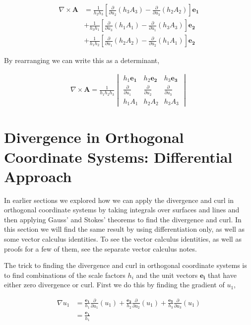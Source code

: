 \documentclass[11pt]{amsart}
\begin{document}
\begin{align*}
  \nabla\times\mathbf{A} &= \frac{1}{h_2h_3}\left[\frac{\partial}{\partial u_2}(h_3A_3)-\frac{\partial}{\partial u_3}(h_2A_2)\right]\mathbf{e_1} \\
&+ \frac{1}{h_3h_1}\left[\frac{\partial}{\partial u_3}(h_1A_1)-\frac{\partial}{\partial u_1}(h_3A_3)\right]\mathbf{e_2} \\
&+ \frac{1}{h_1h_2}\left[\frac{\partial}{\partial u_1}(h_2A_2)-\frac{\partial}{\partial u_2}(h_1A_1)\right]\mathbf{e_2}
\end{align*}

By rearranging we can write this as a determinant,

\begin{align*}
  \nabla\times\mathbf{A} = \frac{1}{h_1h_2h_3}
  \begin{vmatrix}
    h_1\mathbf{e_1} & h_2\mathbf{e_2} & h_3\mathbf{e_3} \\[6pt]
    \frac{\partial}{\partial u_1} & \frac{\partial}{\partial u_2} & \frac{\partial}{\partial u_3} \\[6pt]
    h_1A_1 & h_2A_2 & h_3A_3
  \end{vmatrix}
\end{align*}


\section{Divergence in Orthogonal Coordinate Systems: Differential Approach}

In earlier sections we explored how we can apply the divergence and curl in orthogonal coordinate systems by taking integrals over surfaces and lines and then applying Gauss' and Stokes' theorems to find the divergence and curl. In this section we will find the same result by using differentiation only, as well as some vector calculus identities. To see the vector calculus identities, as well as proofs for a few of them, see the separate vector calculus notes.

The trick to finding the divergence and curl in orthogonal coordinate systems is to find combinations of the scale factors $h_i$ and the unit vectors $\mathbf{e_i}$ that have either zero divergence or curl. First we do this by finding the gradient of $u_1$,

\begin{align*}
  \nabla u_1 &= \frac{\mathbf{e_1}}{h_1}\frac{\partial}{\partial u_1}\left(u_1\right) + \frac{\mathbf{e_2}}{h_2}\frac{\partial}{\partial u_2}\left(u_1\right) + \frac{\mathbf{e_3}}{h_3}\frac{\partial}{\partial u_3}\left(u_1\right) \\
             &= \frac{\mathbf{e_1}}{h_1}
\end{align*}
\end{document}
